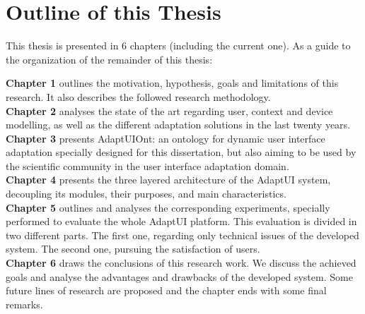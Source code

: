 
\section{Outline of this Thesis}
\label{sec:outline}

This thesis is presented in 6 chapters (including the current one). As a guide 
to the organization of the remainder of this thesis:

\hspace*{5mm} \textbf{Chapter 1} outlines the motivation, hypothesis, goals and 
limitations of this research. It also describes the followed research 
methodology. \\

\hspace*{5mm} \textbf{Chapter 2} analyses the state of the art regarding user, 
context and device modelling, as well as the different adaptation solutions in 
the last twenty years. \\

\hspace*{5mm} \textbf{Chapter 3} presents AdaptUIOnt: an ontology for 
dynamic user interface adaptation specially designed for this dissertation, 
but also aiming to be used by the scientific community in the user interface 
adaptation domain.\\

\hspace*{5mm} \textbf{Chapter 4} presents the three layered architecture of 
the AdaptUI system, decoupling its modules, their purposes, and main 
characteristics.\\

\hspace*{5mm} \textbf{Chapter 5} outlines and analyses the corresponding
experiments, specially performed to evaluate the whole AdaptUI platform. This
evaluation is divided in two different parts. The first one, regarding only
technical issues of the developed system. The second one, pursuing the 
satisfaction of users.\\

\hspace*{5mm} \textbf{Chapter 6} draws the conclusions of this research work. We 
discuss the achieved goals and analyse the advantages and drawbacks of the 
developed system. Some future lines of research are proposed and the chapter 
ends with some final remarks.\\


% 
